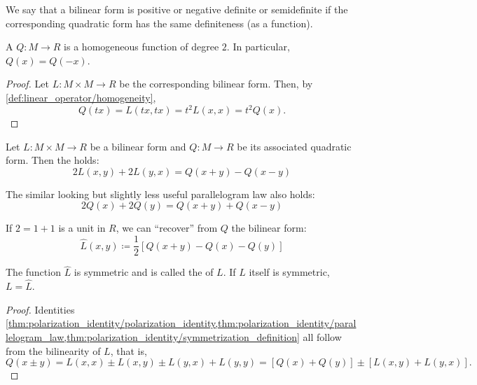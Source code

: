 \begin{definition}\label{def:quadratic_form_definiteness}
  We say that a bilinear form is positive or negative definite or semidefinite if the corresponding quadratic form has the same definiteness (as a function).
\end{definition}

\begin{proposition}\label{thm:bilinear_forms_vs_to_quadratic_forms}
  A  \( Q: M \to R \) is a homogeneous function of degree \( 2 \). In particular, \( Q(x) = Q(-x) \).
\end{proposition}
\begin{proof}
  Let \( L: M \times M \to R \) be the corresponding bilinear form. Then, by \ref{def:linear_operator/homogeneity},
  \begin{equation*}
    Q(tx) = L(tx, tx) = t^2 L(x, x) = t^2 Q(x).
  \end{equation*}
\end{proof}

\begin{proposition}\label{thm:polarization_identity}\cite{nLab:polarization_identity}
  Let \( L: M \times M \to R \) be a bilinear form and \( Q: M \to R \) be its associated quadratic form. Then the  holds:
  \begin{equation}\label{thm:polarization_identity/polarization_identity}
    2 L(x, y) + 2 L(y, x) = Q(x + y) - Q(x - y)
  \end{equation}

  The similar looking but slightly less useful parallelogram law also holds:
  \begin{equation}\label{thm:polarization_identity/parallelogram_law}
    2 Q(x) + 2 Q(y) = Q(x + y) + Q(x - y)
  \end{equation}

  If \( 2 = 1 + 1 \) is a unit in \( R \), we can \enquote{recover} from \( Q \) the bilinear form:
  \begin{equation}\label{thm:polarization_identity/symmetrization_definition}
    \hat L(x, y) \coloneqq \frac 1 2 \left[ Q(x + y) - Q(x) - Q(y) \right]
  \end{equation}

  The function \( \hat L \) is symmetric and is called the  of \( L \). If \( L \) itself is symmetric, \( L = \hat L \).
\end{proposition}
\begin{proof}
  Identities \cref{thm:polarization_identity/polarization_identity,thm:polarization_identity/parallelogram_law,thm:polarization_identity/symmetrization_definition} all follow from the bilinearity of \( L \), that is,
  \begin{equation*}
    Q(x \pm y)
    =
    L(x, x) \pm L(x, y) \pm L(y, x) + L(y, y)
    =
    [Q(x) + Q(y)] \pm [L(x, y) + L(y, x)].
  \end{equation*}
\end{proof}

